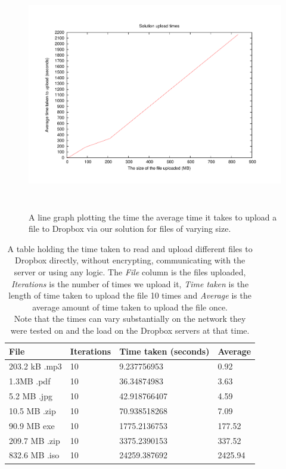 \documentclass[12pt, titlepage]{article}
\begin{document}
\begin{figure}[H]
\centerline{\includegraphics[height=4.0in,width=7in,angle=0]{plots/solutionUpload/solutionUploadTimes.pdf}}
\caption{A line graph plotting the time the average time it takes to upload a file to Dropbox via our solution for files of varying size.}
\label{fig:solutionUploadLineGraph}
\end{figure}

\begin{table}[H]
\begin{center}
    \begin{tabular}{ | l | l | l | l |}
    \hline
    \textbf{File} & \textbf{Iterations} & \textbf{Time taken (seconds)} & \textbf{Average} \\ \hline
    203.2 kB .mp3 & 10 & 9.237756953 & 0.92 \\ \hline
    1.3MB .pdf & 10 & 36.34874983 & 3.63 \\ \hline
	5.2 MB .jpg & 10 & 42.918766407 & 4.59 \\ \hline
    10.5 MB .zip & 10 & 70.938518268 & 7.09 \\ \hline
    90.9 MB exe & 10 & 1775.2136753  & 177.52 \\ \hline
    209.7 MB .zip & 10 & 3375.2390153 & 337.52 \\ \hline
    832.6 MB .iso & 10 & 24259.387692 & 2425.94 \\ \hline
    \end{tabular}
    \caption{A table holding the time taken to read and upload different files to Dropbox directly, without encrypting, communicating with the server or using any logic. The \textit{File} column is the files uploaded, \textit{Iterations} is the number of times we upload it, \textit{Time taken} is the length of time taken to upload the file 10 times and \textit{Average} is the average amount of time taken to upload the file once.
    \\ Note that the times can vary substantially on the network they were tested on and the load on the Dropbox servers at that time.} \label{tab:uploadDropboxBenchmark}
    \end{center}
\end{table}
\end{document}
